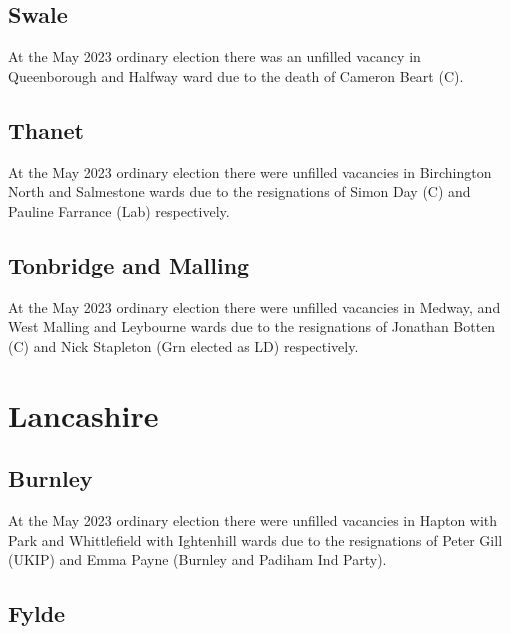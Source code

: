 \documentclass[a4paper,openany]{book}
\begin{document}
\begin{resultsiii}
\subsection*{Swale}

At the May 2023 ordinary election there was an unfilled vacancy in Queenborough and Halfway ward due to the death of Cameron Beart (C).%

\subsection*{Thanet}

At the May 2023 ordinary election there were unfilled vacancies in Birchington North and Salmestone wards due to the resignations of Simon Day (C) and Pauline Farrance (Lab) respectively.%
%
%

\subsection*{Tonbridge and Malling}

At the May 2023 ordinary election there were unfilled vacancies in Medway, and West Malling and Leybourne wards due to the resignations of Jonathan Botten (C) and Nick Stapleton (Grn elected as LD) respectively.%
%

\section{Lancashire}

\subsection*{Burnley}

At the May 2023 ordinary election there were unfilled vacancies in Hapton with Park and Whittlefield with Ightenhill wards due to the resignations of Peter Gill (UKIP) and Emma Payne (Burnley and Padiham Ind Party).%
%

\subsection*{Fylde}


\end{resultsiii}
\end{document}
